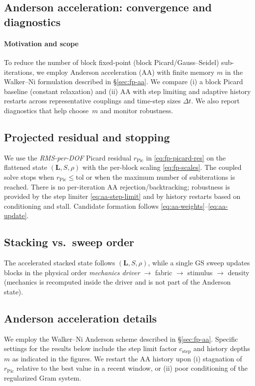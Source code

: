 \subsection*{Anderson acceleration: convergence and diagnostics}
\label{subsec:anderson}
\paragraph{Motivation and scope}
To reduce the number of block fixed-point (block Picard/Gauss--Seidel) sub-iterations, we employ Anderson acceleration (AA) with finite memory $m$ in the Walker--Ni formulation described in \S\ref{sec:fp-aa}. We compare (i) a block Picard baseline (constant relaxation) and (ii) AA with step limiting and adaptive history restarts across representative couplings and time-step sizes $\Delta t$. We also report diagnostics that help choose~$m$ and monitor robustness.

\subsection*{Projected residual and stopping}\label{subsec:proj_merit}
We use the \emph{RMS-per-DOF} Picard residual $r_{\mathrm{Pic}}$ in \eqref{eq:fp-picard-res} on the flattened state $(\mathbf L,S,\rho)$ with the per-block scaling \eqref{eq:fp-scales}. The coupled solve stops when $r_{\mathrm{Pic}}\le \mathrm{tol}$ or when the maximum number of subiterations is reached. There is no per-iteration AA rejection/backtracking; robustness is provided by the step limiter \eqref{eq:aa-step-limit} and by history restarts based on conditioning and stall. Candidate formation follows \eqref{eq:aa-weights}--\eqref{eq:aa-update}.

\subsection*{Stacking vs.\ sweep order}\label{subsec:order}
The accelerated stacked state follows $(\mathbf L,S,\rho)$, while a single GS sweep updates blocks in the physical order \emph{mechanics driver} $\to$ fabric $\to$ stimulus $\to$ density (mechanics is recomputed inside the driver and is not part of the Anderson state).

\subsection*{Anderson acceleration details}\label{subsec:aa_details}
We employ the Walker--Ni Anderson scheme described in \S\ref{sec:fp-aa}. Specific settings for the results below include the step limit factor $c_{\mathrm{step}}$ and history depths $m$ as indicated in the figures. We restart the AA history upon (i) stagnation of $r_{\mathrm{Pic}}$ relative to the best value in a recent window, or (ii) poor conditioning of the regularized Gram system.

